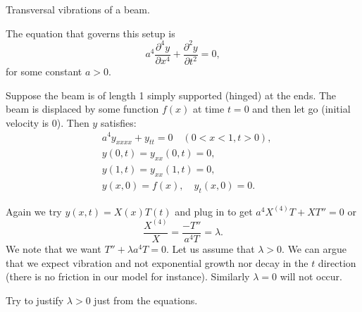 \begin{myfig}
\capstart
{}
\caption{Transversal vibrations of a beam.\label{appeig:transbeamfig}}
\end{myfig}

The equation that governs this setup is
\begin{equation*}
a^4 \frac{\partial^4 y}{\partial x^4} + \frac{\partial^2 y}{\partial t^2} = 0,
\end{equation*}
for some constant $a > 0$.%

Suppose the beam is of length 1 simply supported (hinged) at the ends.
The beam is displaced by some function $f(x)$ at time $t=0$ and then
let go (initial velocity is 0).  Then $y$ satisfies:
\begin{equation} \label{appeig:beameq}
\begin{aligned}
& a^4 y_{xxxx} + y_{tt} = 0 \quad (0 < x < 1, t > 0), \\
& y(0,t) = y_{xx}(0,t) = 0 , \\
& y(1,t) = y_{xx}(1,t) = 0 , \\
& y(x,0) = f(x), \quad y_{t}(x,0) = 0 .
\end{aligned}
\end{equation}

Again we try $y(x,t) = X(x)T(t)$ and plug in to get
$a^4 X^{(4)}T + XT'' = 0$ or 
\begin{equation*}
\frac{X^{(4)}}{X} = \frac{- T''}{a^4T} = \lambda .
\end{equation*}
We note that we want $T'' + \lambda a^4T = 0$.  Let us assume that $\lambda >
0$.  We can argue that we expect vibration and not exponential growth nor
decay in the $t$ direction (there is no friction in our model for instance).
Similarly $\lambda = 0$ will not occur.

\begin{exercise}
Try to justify $\lambda > 0$ just from the equations.
\end{exercise}

